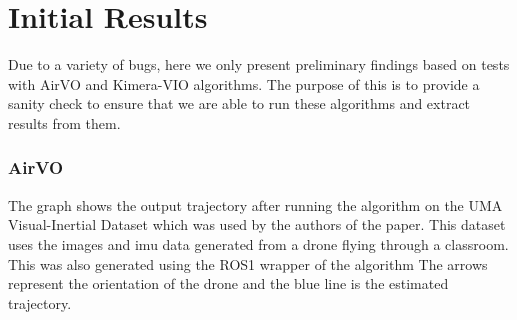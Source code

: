 \documentclass{article}
\begin{document}
\section{Initial Results}
Due to a variety of bugs, here we only present preliminary findings based on tests with AirVO and Kimera-VIO algorithms. The purpose of this is to provide a sanity check to ensure that we are able to run these algorithms and extract results from them. 
\subsubsection*{AirVO}
The graph shows the output trajectory after running the algorithm on the UMA Visual-Inertial Dataset which was used by the authors of the paper. This dataset uses the images and imu data generated from a drone flying through a classroom. This was also generated using the ROS1 wrapper of the algorithm The arrows represent the orientation of the drone and the blue line is the estimated trajectory.
\end{document}
